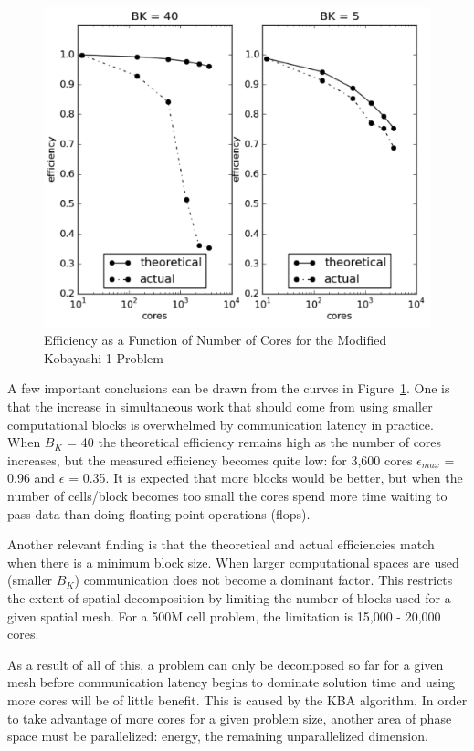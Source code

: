 \begin{figure}[!h]
  \begin{center}
    \includegraphics [width=.9\textwidth, height=0.5\textheight ] {JagBlockStudy}
  \end{center}
  \caption{Efficiency as a Function of Number of Cores for the Modified Kobayashi 1 Problem}
  \label{fig:JagBlockStudy}
\end{figure}

A few important conclusions can be drawn from the curves in Figure~\ref{fig:JagBlockStudy}. One is that the increase in simultaneous work that should come from using smaller computational blocks is overwhelmed by communication latency in practice. When $B_{K}$ = 40 the theoretical efficiency remains high as the number of cores increases, but the measured efficiency becomes quite low: for 3,600 cores $\epsilon_{max}$ = 0.96 and $\epsilon$ = 0.35. It is expected that more blocks would be better, but when the number of cells/block becomes too small the cores spend more time waiting to pass data than doing floating point operations (flops). 

Another relevant finding is that the theoretical and actual efficiencies match when there is a minimum block size. When larger computational spaces are used (smaller $B_{K}$) communication does not become a dominant factor. This restricts the extent of spatial decomposition by limiting the number of blocks used for a given spatial mesh. For a 500M cell problem, the limitation is 15,000 - 20,000 cores. 

As a result of all of this, a problem can only be decomposed so far for a given mesh before communication latency begins to dominate solution time and using more cores will be of little benefit. This is caused by the KBA algorithm. In order to take advantage of more cores for a given problem size, another area of phase space must be parallelized: energy, the remaining unparallelized dimension. 


